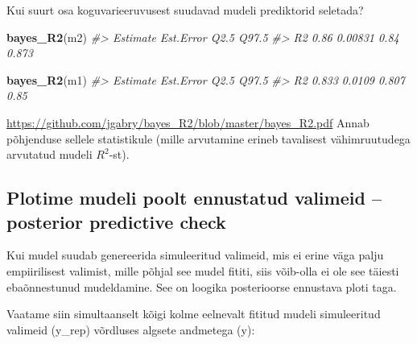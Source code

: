 \documentclass[]{book}
\newenvironment{Shaded}{\begin{snugshade}}{\end{snugshade}}
\newcommand{\CommentTok}[1]{\textcolor[rgb]{0.56,0.35,0.01}{\textit{#1}}}
\newcommand{\DataTypeTok}[1]{\textcolor[rgb]{0.13,0.29,0.53}{#1}}
\newcommand{\DecValTok}[1]{\textcolor[rgb]{0.00,0.00,0.81}{#1}}
\newcommand{\KeywordTok}[1]{\textcolor[rgb]{0.13,0.29,0.53}{\textbf{#1}}}
\newcommand{\NormalTok}[1]{#1}
\newcommand{\OperatorTok}[1]{\textcolor[rgb]{0.81,0.36,0.00}{\textbf{#1}}}
\newcommand{\StringTok}[1]{\textcolor[rgb]{0.31,0.60,0.02}{#1}}
\begin{document}
Kui suurt osa koguvarieeruvusest suudavad mudeli prediktorid seletada?

\begin{Shaded}
\begin{Highlighting}[]
\KeywordTok{bayes_R2}\NormalTok{(m2)}
\CommentTok{#>    Estimate Est.Error Q2.5 Q97.5}
\CommentTok{#> R2     0.86   0.00831 0.84 0.873}
\end{Highlighting}
\end{Shaded}

\begin{Shaded}
\begin{Highlighting}[]
\KeywordTok{bayes_R2}\NormalTok{(m1)}
\CommentTok{#>    Estimate Est.Error  Q2.5 Q97.5}
\CommentTok{#> R2    0.833    0.0109 0.807  0.85}
\end{Highlighting}
\end{Shaded}

\url{https://github.com/jgabry/bayes_R2/blob/master/bayes_R2.pdf}
Annab põhjenduse sellele statistikule (mille arvutamine erineb tavalisest vähimruutudega arvutatud mudeli \(R^2\)-st).

\hypertarget{plotime-mudeli-poolt-ennustatud-valimeid-posterior-predictive-check}{%
\subsection{Plotime mudeli poolt ennustatud valimeid -- posterior predictive check}\label{plotime-mudeli-poolt-ennustatud-valimeid-posterior-predictive-check}}

Kui mudel suudab genereerida simuleeritud valimeid, mis ei erine väga palju empiirilisest valimist, mille põhjal see mudel fititi, siis võib-olla ei ole see täiesti ebaõnnestunud mudeldamine. See on loogika posterioorse ennustava ploti taga.

Vaatame siin simultaanselt kõigi kolme eelnevalt fititud mudeli simuleeritud valimeid (y\_rep) võrdluses algsete andmetega (y):

\begin{Shaded}
\end{Shaded}
\end{document}
